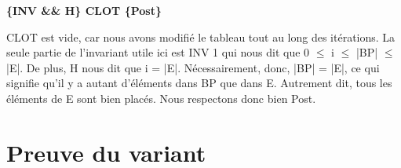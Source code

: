 \documentclass[a4paper, 12pt]{report}
\begin{document}
\textbf{\{INV && H\} CLOT \{Post\}}


CLOT est vide, car nous avons modifié le tableau tout au long des itérations.
La seule partie de l'invariant utile ici est INV 1 qui nous dit que 0 $\le$ i $\le$ |BP| $\le$ |E|. De plus, H nous dit que i = |E|. Nécessairement, donc, |BP| = |E|, ce qui signifie qu'il y a autant d'éléments dans BP que dans E. Autrement dit, tous les éléments de E sont bien placés.
Nous respectons donc bien Post.

\section{Preuve du variant}
\end{document}
